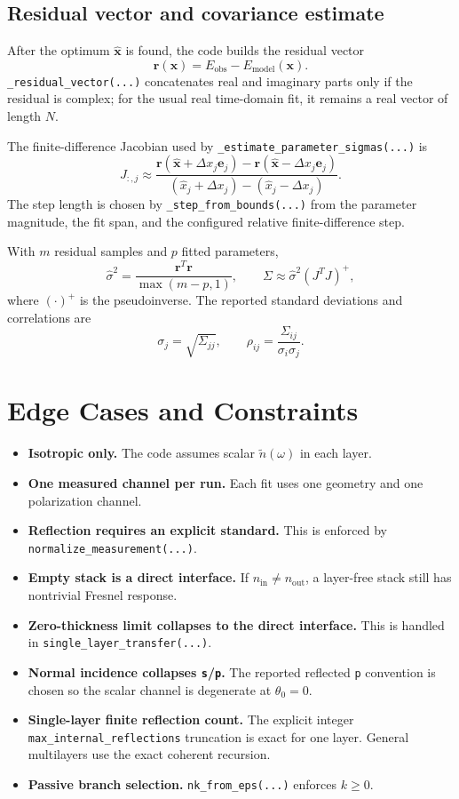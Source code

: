 \documentclass[11pt]{article}
\begin{document}
\subsection{Residual vector and covariance estimate}
After the optimum $\hat{\mathbf{x}}$ is found, the code builds the residual vector
\[
\mathbf{r}(\mathbf{x}) = E_{\text{obs}} - E_{\text{model}}(\mathbf{x}).
\]
\texttt{\_residual\_vector(...)} concatenates real and imaginary parts only if the residual is
complex; for the usual real time-domain fit, it remains a real vector of length $N$.

The finite-difference Jacobian used by \texttt{\_estimate\_parameter\_sigmas(...)} is
\[
J_{:,j}
\approx
\frac{
\mathbf{r}(\hat{\mathbf{x}}+\Delta x_j \mathbf{e}_j)
-
\mathbf{r}(\hat{\mathbf{x}}-\Delta x_j \mathbf{e}_j)
}
{
(\hat{x}_j+\Delta x_j)-(\hat{x}_j-\Delta x_j)
}.
\]
The step length is chosen by \texttt{\_step\_from\_bounds(...)} from the parameter magnitude,
the fit span, and the configured relative finite-difference step.

With $m$ residual samples and $p$ fitted parameters,
\[
\hat{\sigma}^2 = \frac{\mathbf{r}^T \mathbf{r}}{\max(m-p,1)},
\qquad
\Sigma \approx \hat{\sigma}^2 (J^T J)^+,
\]
where $(\cdot)^+$ is the pseudoinverse. The reported standard deviations and correlations are
\[
\sigma_j = \sqrt{\Sigma_{jj}},
\qquad
\rho_{ij} = \frac{\Sigma_{ij}}{\sigma_i \sigma_j}.
\]

\section{Edge Cases and Constraints}
\begin{itemize}[leftmargin=2em]
\item \textbf{Isotropic only.} The code assumes scalar $\tilde{n}(\omega)$ in each layer.
\item \textbf{One measured channel per run.} Each fit uses one geometry and one polarization
channel.
\item \textbf{Reflection requires an explicit standard.} This is enforced by
\texttt{normalize\_measurement(...)}.
\item \textbf{Empty stack is a direct interface.} If $n_{\text{in}} \neq n_{\text{out}}$, a
layer-free stack still has nontrivial Fresnel response.
\item \textbf{Zero-thickness limit collapses to the direct interface.} This is handled in
\texttt{single\_layer\_transfer(...)}.
\item \textbf{Normal incidence collapses \texttt{s}/\texttt{p}.} The reported reflected
\texttt{p} convention is chosen so the scalar channel is degenerate at $\theta_0=0$.
\item \textbf{Single-layer finite reflection count.} The explicit integer
\texttt{max\_internal\_reflections} truncation is exact for one layer. General multilayers use
the exact coherent recursion.
\item \textbf{Passive branch selection.} \texttt{nk\_from\_eps(...)} enforces $k \ge 0$.
\end{itemize}
\end{document}
